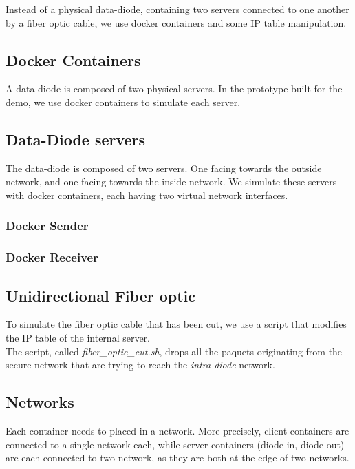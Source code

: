 \documentclass[a4paper,11pt]{article}
\begin{document}
Instead of a physical data-diode, containing two servers connected to one another by a fiber optic cable, we use docker containers and some IP table manipulation.

\subsection{Docker Containers}
A data-diode is composed of two physical servers. In the prototype built for the demo, we use docker containers to simulate each server.


\subsection{Data-Diode servers}
The data-diode is composed of two servers. One facing towards the outside network, and one facing towards the inside network. We simulate these servers with docker containers, each having two virtual network interfaces.

\subsubsection{Docker Sender}

\subsubsection{Docker Receiver}

\subsection{Unidirectional Fiber optic}
To simulate the fiber optic cable that has been cut, we use a script that modifies the IP table of the internal server.\\

The script, called \textit{fiber\_optic\_cut.sh}, drops all the paquets originating from the secure network that are trying to reach the \textit{intra-diode} network.

\subsection{Networks}
Each container needs to placed in a network. More precisely, client containers are connected to a single network each, while server containers (diode-in, diode-out) are each connected to two network, as they are both at the edge of two networks.\\
\end{document}
